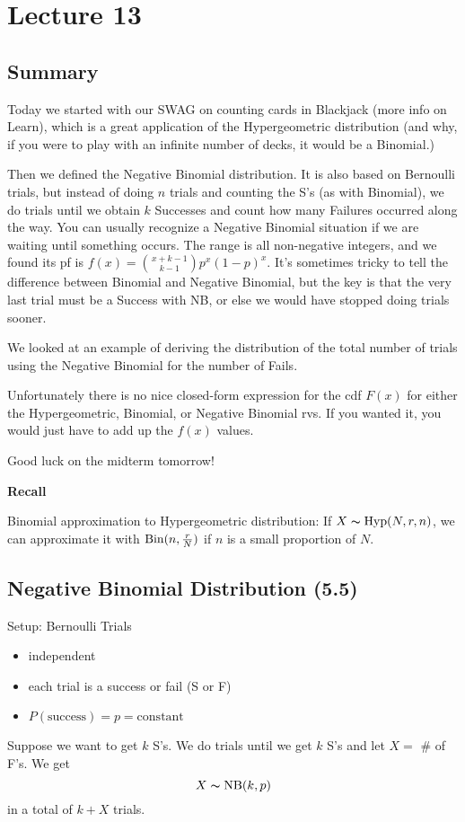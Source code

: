 \section{Lecture 13}
\subsection{Summary}

Today we started with our SWAG on counting cards in Blackjack (more info on Learn), which is a great application of the Hypergeometric distribution (and why, if you were to play with an infinite number of decks, it would be a Binomial.)

Then we defined the Negative Binomial distribution. It is also based on Bernoulli trials, but instead of doing $n$ trials and counting the S's (as with Binomial), we do trials until we obtain $k$ Successes and count how many Failures occurred along the way. You can usually recognize a Negative Binomial situation if we are waiting until something occurs. The range is all non-negative integers, and we found its pf is $f(x)=\binom{x+k-1}{k-1}p^x(1-p)^x$. It's sometimes tricky to tell the difference between Binomial and Negative Binomial, but the key is that the very last trial must be a Success with NB, or else we would have stopped doing trials sooner.

We looked at an example of deriving the distribution of the total number of trials using the Negative Binomial for the number of Fails.

Unfortunately there is no nice closed-form expression for the cdf $F(x)$ for
either the Hypergeometric, Binomial, or Negative Binomial rvs. If you wanted it,
you would just have to add up the $f(x)$ values.

Good luck on the midterm tomorrow!

\textbf{Recall}

Binomial approximation to Hypergeometric distribution:
If $ X\thicksim\operatorname{Hyp} (N,r,n) $, we can approximate it with 
$ \operatorname{Bin} (n,\frac{r}{N}) $ if $ n $ is a small proportion of $ N $.

\subsection{Negative Binomial Distribution (5.5)}
Setup: Bernoulli Trials
\begin{itemize}
    \item independent
    \item each trial is a success or fail (S or F)
    \item $ P(\text{success})=p=\text{constant} $ 
\end{itemize}
Suppose we want to get $ k $ S's. We do trials until we get
$ k $ S's and let $ X= $ \# of F's. We get
\[ X\thicksim \operatorname{NB}(k,p) \]
in a total of $ k+X $ trials.


